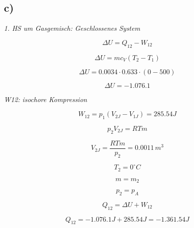 

\subsection*{c)}
\textit{1. HS um Gasgemisch: Geschlossenes System}

\[
\Delta U = Q_{12} - W_{12}
\]

\[
\Delta U = m c_V (T_2 - T_1)
\]

\[
\Delta U = 0.0034 \cdot 0.633 \cdot (0 - 500)
\]

\[
\Delta U = -1.076.1
\]

\textit{W12: isochore Kompression}

\[
W_{12} = p_1 \left( V_{2J} - V_{1J} \right) = 285.54 J
\]

\[
p_2 V_{2J} = R T m
\]

\[
V_{2J} = \frac{R T m}{p_2} = 0.0011 \, m^3
\]

\[
T_2 = 0^\circ C
\]

\[
m = m_2
\]

\[
p_2 = p_A
\]

\[
Q_{12} = \Delta U + W_{12}
\]

\[
Q_{12} = -1.076.1 J + 285.54 J = -1.361.54 J
\]